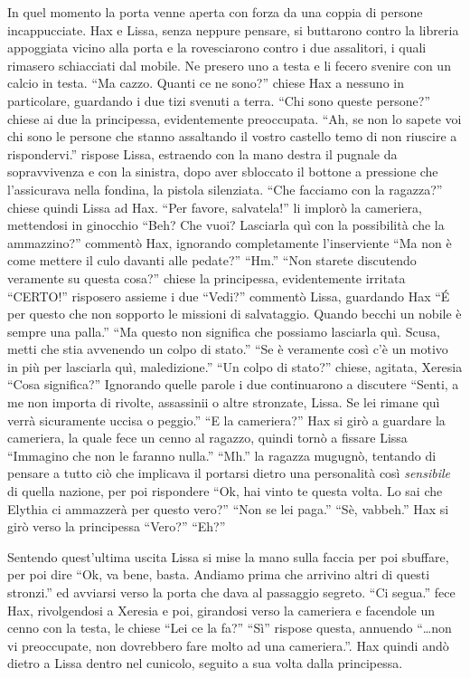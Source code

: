     In quel momento la porta venne aperta con forza da una coppia di
    persone incappucciate. Hax e Lissa, senza neppure pensare, si buttarono
    contro la libreria appoggiata vicino alla porta e la rovesciarono
    contro i due assalitori, i quali rimasero schiacciati dal mobile. Ne
    presero uno a testa e li fecero svenire con un calcio in testa. ``Ma
    cazzo. Quanti ce ne sono?'' chiese Hax a nessuno in particolare,
    guardando i due tizi svenuti a terra. ``Chi sono queste persone?''
    chiese ai due la principessa, evidentemente preoccupata. ``Ah, se non
    lo sapete voi chi sono le persone che stanno assaltando il vostro
    castello temo di non riuscire a rispondervi.'' rispose Lissa,
    estraendo con la mano destra il pugnale da sopravvivenza e con la
    sinistra, dopo aver sbloccato il bottone a pressione che l'assicurava
    nella fondina, la pistola silenziata. ``Che facciamo con la ragazza?''
    chiese quindi Lissa ad Hax. ``Per favore, salvatela!'' li implorò la
    cameriera, mettendosi in ginocchio ``Beh? Che vuoi? Lasciarla quì con
    la possibilità che la ammazzino?'' commentò Hax, ignorando
    completamente l'inserviente ``Ma non è come mettere il culo davanti
    alle pedate?'' ``Hm.'' ``Non starete discutendo veramente su questa
    cosa?'' chiese la principessa, evidentemente irritata ``CERTO!''
    risposero assieme i due ``Vedi?'' commentò Lissa, guardando Hax ``\'E
    per questo che non sopporto le missioni di salvataggio. Quando becchi
    un nobile è sempre una palla.'' ``Ma questo non significa che possiamo
    lasciarla quì. Scusa, metti che stia avvenendo un colpo di stato.''
    ``Se è veramente così c'è un motivo in più per lasciarla quì,
    maledizione.'' ``Un colpo di stato?'' chiese, agitata, Xeresia ``Cosa
    significa?'' Ignorando quelle parole i due continuarono a discutere
    ``Senti, a me non importa di rivolte, assassinii o altre stronzate,
    Lissa. Se lei rimane quì verrà sicuramente uccisa o peggio.'' ``E la
    cameriera?'' Hax si girò a guardare la cameriera, la quale fece un
    cenno al ragazzo, quindi tornò a fissare Lissa ``Immagino che non le
    faranno nulla.'' ``Mh.'' la ragazza mugugnò, tentando di pensare a
    tutto ciò che implicava il portarsi dietro una personalità così
    \emph{sensibile} di quella nazione, per poi rispondere ``Ok, hai vinto
    te questa volta. Lo sai che Elythia ci ammazzerà per questo vero?''
    ``Non se lei paga.'' ``Sè, vabbeh.'' Hax si girò verso la principessa
    ``Vero?'' ``Eh?''

    Sentendo quest'ultima uscita Lissa si mise la mano sulla faccia per
    poi sbuffare, per poi dire ``Ok, va bene, basta. Andiamo prima che arrivino altri di
    questi stronzi.'' ed avviarsi verso la porta che dava al passaggio
    segreto. ``Ci segua.'' fece Hax, rivolgendosi a Xeresia e poi,
    girandosi verso la cameriera e facendole un cenno con la testa, le
    chiese ``Lei ce la fa?'' ``Sì'' rispose questa,
    annuendo ``\dots{}non vi preoccupate, non dovrebbero fare molto ad una
    cameriera.''. Hax quindi andò dietro a Lissa dentro nel cunicolo, seguito a
    sua volta dalla principessa.

